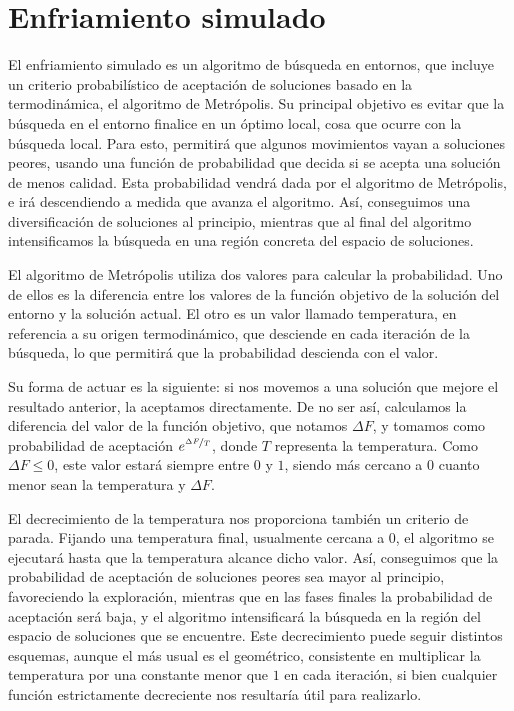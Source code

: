 \section{Enfriamiento simulado}\label{enfriamiento}

El enfriamiento simulado \citep{kirkpatrick:1983} es un algoritmo de búsqueda en
entornos, que incluye un criterio probabilístico de aceptación de soluciones basado
en la termodinámica, el algoritmo de Metrópolis. Su principal objetivo es evitar que
la búsqueda en el entorno finalice en un óptimo local, cosa que ocurre con la búsqueda
local. Para esto, permitirá que algunos movimientos vayan a soluciones peores, usando
una función de probabilidad que decida si se acepta una solución de menos calidad.
Esta probabilidad vendrá dada por el algoritmo de Metrópolis, e irá
descendiendo a medida que avanza el algoritmo. Así, conseguimos una diversificación de
soluciones al principio, mientras que al final del algoritmo intensificamos la búsqueda
en una región concreta del espacio de soluciones.

El algoritmo de Metrópolis utiliza dos valores para calcular la probabilidad. Uno de ellos
es la diferencia entre los valores de la función objetivo de la solución del entorno y
la solución actual. El otro es un valor llamado temperatura, en referencia a su origen
termodinámico, que desciende en cada iteración de la búsqueda, lo que permitirá que
la probabilidad descienda con el valor.

Su forma de actuar es la siguiente: si nos movemos a una solución que mejore el resultado
anterior, la aceptamos directamente. De no ser así, calculamos la diferencia del valor de
la función objetivo, que notamos $\Delta F$, y tomamos como probabilidad de aceptación
$e^{\nicefrac{\Delta F}{T}}$, donde $T$ representa la temperatura. Como $\Delta F \leq 0$,
este valor estará siempre entre $0$ y $1$, siendo más cercano a $0$ cuanto menor sean
la temperatura y $\Delta F$.

El decrecimiento de la temperatura nos proporciona también un criterio de parada. Fijando
una temperatura final, usualmente cercana a $0$, el algoritmo se ejecutará hasta que la
temperatura alcance dicho valor. Así, conseguimos que la probabilidad de aceptación de
soluciones peores sea mayor al principio, favoreciendo la exploración, mientras que en
las fases finales la probabilidad de aceptación será baja, y el algoritmo intensificará
la búsqueda en la región del espacio de soluciones que se encuentre. Este decrecimiento
puede seguir distintos esquemas, aunque el más usual es el geométrico, consistente en
multiplicar la temperatura por una constante menor que $1$ en cada iteración, si bien
cualquier función estrictamente decreciente nos resultaría útil para realizarlo.

